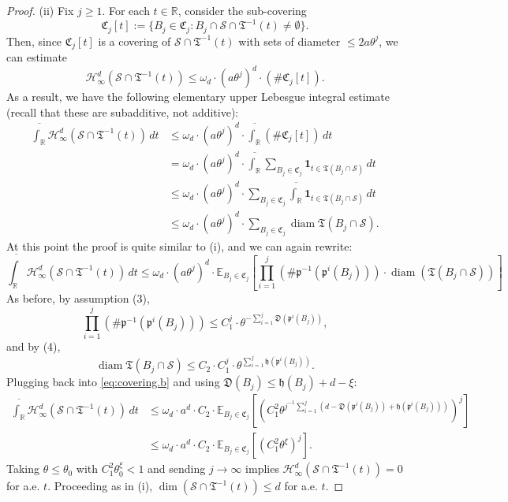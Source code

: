 \documentclass[11pt, letterpaper, reqno]{amsart}
\numberwithin{equation}{section}
\theoremstyle{remark}
\newcommand{\RR}{\mathbb{R}}
\newcommand{\cH}{\mathcal{H}}
\newcommand{\cS}{\mathcal{S}}
\newcommand{\frT}{\mathfrak{T}}
\begin{document}
\begin{proof}
	(ii) Fix $j \geq 1$. For each $t \in \RR$, consider the sub-covering
	\[ \mathfrak{C}_j[t] := \{ B_j \in \mathfrak{C}_j : B_j \cap \cS \cap \frT^{-1}(t) \neq \emptyset \}. \]
	Then, since $\mathfrak{C}_j[t]$ is a covering of $\cS \cap \frT^{-1}(t)$ with sets of diameter $\leq 2a \theta^j$, we can estimate
	\[ \cH^d_\infty(\cS \cap \frT^{-1}(t)) \leq \omega_d \cdot (a\theta^j)^d \cdot (\# \mathfrak{C}_j[t]). \]
	As a result, we have the following elementary upper Lebesgue integral estimate (recall that these are  subadditive, not additive):
	\begin{align*}
		\overline{\int_\RR} \cH^d_\infty(\cS \cap \frT^{-1}(t)) \, dt
			& \leq \omega_d \cdot (a\theta^j)^d \cdot \overline{\int_\RR} (\# \mathfrak{C}_j[t]) \, dt \\
			& = \omega_d \cdot (a\theta^j)^d \cdot \overline{\int_\RR} \sum_{B_j \in \mathfrak{C}_j} \mathbf{1}_{t \in \frT(B_j \cap \cS)} \, dt \\
			& \leq \omega_d \cdot (a\theta^j)^d \cdot \sum_{B_j \in \mathfrak{C}_j} \overline{\int_\RR} \mathbf{1}_{t \in \frT(B_j \cap \cS)} \, dt \\
			& \leq \omega_d \cdot (a\theta^j)^d \cdot \sum_{B_j \in \mathfrak{C}_j} \operatorname{diam} \frT(B_j \cap \cS).
	\end{align*}
	At this point the proof is quite similar to (i), and we can again rewrite:
	\begin{equation} \label{eq:covering.b}
		\overline{\int_\RR} \cH^d_\infty(\cS \cap \frT^{-1}(t)) \, dt \leq \omega_d \cdot (a\theta^j)^d \cdot \mathbb{E}_{B_j \in \mathfrak{C}_j} \left[ \prod_{i=1}^j (\# \mathfrak{p}^{-1}(\mathfrak{p}^i(B_j))) \cdot \operatorname{diam} (\frT(B_j \cap \cS)) \right]
	\end{equation}
	As before, by assumption (3),
	\[ \prod_{i=1}^j (\# \mathfrak{p}^{-1}(\mathfrak{p}^i(B_j))) \leq C_1^j \cdot \theta^{-\sum_{i=1}^j \mathfrak{D}(\mathfrak{p}^i(B_j))}, \]
	and by (4),
	\[ \operatorname{diam} \frT(B_j \cap \cS) \leq C_2 \cdot C_1^{j} \cdot \theta^{\sum_{i=1}^j \mathfrak{h}(\mathfrak{p}^i(B_j))}. \]
	Plugging back into \eqref{eq:covering.b} and using $\mathfrak{D}(B_j) \leq \mathfrak{h}(B_j) + d - \xi$:
	\begin{align*}
		\overline{\int_\RR} \cH^d_\infty(\cS \cap \frT^{-1}(t)) \, dt
			& \leq \omega_d \cdot a^d \cdot C_2 \cdot \mathbb{E}_{B_j \in \mathfrak{C}_j} \left[ \left( C_1^2 \theta^{j^{-1} \sum_{i=1}^j(d -\mathfrak{D}(\mathfrak{p}^i(B_j)) + \mathfrak{h}(\mathfrak{p}^i(B_j)))} \right)^j \right] \\
			& \leq \omega_d \cdot a^d \cdot C_2 \cdot \mathbb{E}_{B_j \in \mathfrak{C}_j} \left[ \left( C_1^2 \theta^{\xi} \right)^j \right].
	\end{align*}
	Taking $\theta \leq \theta_0$ with $C_1^2 \theta_0^\xi < 1$ and sending $j \to \infty$ implies $\cH^d_\infty(\cS \cap \frT^{-1}(t)) = 0$ for a.e. $t$. Proceeding as in (i), $\dim (\cS \cap \frT^{-1}(t)) \leq d$ for a.e. $t$.
\end{proof}
\end{document}
